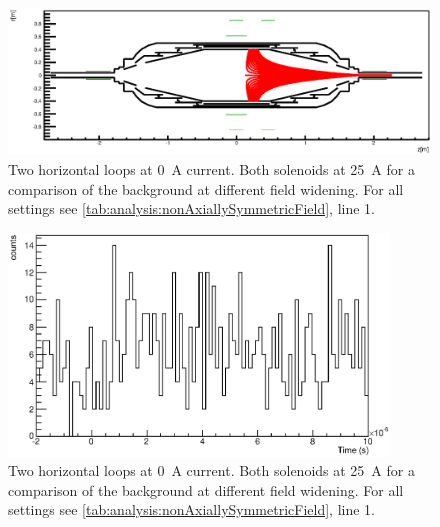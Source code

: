 \begin{figure}
\centering
	\centerline{\includegraphics[width = 1.3\linewidth]{graphics/analysis/monSpec/fieldSimulation/AE.eps} }
	
	\caption[\SI{50}{\ampere} loops]{Two horizontal loops at \SI{0}{\ampere} current. Both solenoids at \SI{25}{\ampere} for a comparison of the background at different field widening. For all settings see \ref{tab:analysis:nonAxiallySymmetricField}, line 1.}
	\label{fig:AEf}
\end{figure}

\begin{figure}[h]
\centering
	\includegraphics[width = 0.9\textwidth]{graphics/analysis/monSpec/AE.eps}
	\caption[\SI{50}{\ampere} loops]{Two horizontal loops at \SI{0}{\ampere} current. Both solenoids at \SI{25}{\ampere} for a comparison of the background at different field widening. For all settings see \ref{tab:analysis:nonAxiallySymmetricField}, line 1.}
	\label{fig:AE}
\end{figure}
\clearpage







